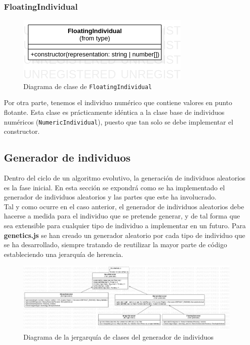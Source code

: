 \subsubsection{FloatingIndividual}

\begin{figure}[ht]
    \centering
    \includegraphics[scale=0.7]{mem/images/cap-4/4.2.2(Individuos)/FloatingIndividual.png}
    \caption{Diagrama de clase de \texttt{FloatingIndividual}}
    \label{fig:binaryindividual-uml}
\end{figure}

Por otra parte, tenemos el individuo numérico que contiene valores en punto flotante. Esta clase es prácticamente idéntica a la clase base de individuos numéricos (\texttt{NumericIndividual}), puesto que tan solo se debe implementar el constructor.

\subsection{Generador de individuos}

Dentro del ciclo de un algoritmo evolutivo, la generación de individuos aleatorios es la fase inicial. En esta sección se expondrá como se ha implementado el generador de individuos aleatorios y las partes que este ha involucrado. \\

Tal y como ocurre en el caso anterior, el generador de individuos aleatorios debe hacerse a medida para el individuo que se pretende generar, y de tal forma que sea extensible para cualquier tipo de individuo a implementar en un futuro. Para \textbf{genetics.js} se han creado un generador aleatorio por cada tipo de individuo que se ha desarrollado, siempre tratando de reutilizar la mayor parte de código estableciendo una jerarquía de herencia.

\begin{figure}[ht]
    \centering
    \includegraphics[scale=0.3]{mem/images/cap-4/4.2.3(Generador)/Generator.png}
    \caption{Diagrama de la jergarquía de clases del generador de individuos}
    \label{fig:generator-uml}
\end{figure}

